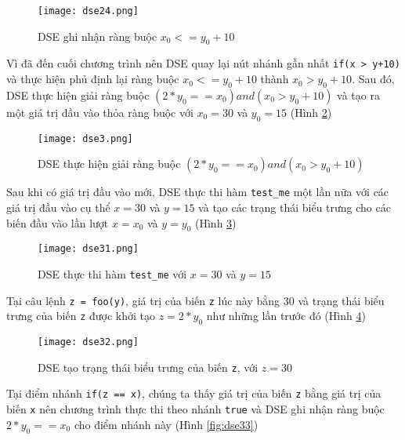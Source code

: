 \begin{figure}[H]
	\caption{DSE ghi nhận ràng buộc $x_{0} <= y_{0} + 10$}
	\label{fig:dse24}
	\begin{center}
		\texttt{[image: dse24.png]}
	\end{center}		
\end{figure}

Vì đã đến cuối chương trình nên DSE quay lại nút nhánh gần nhất \texttt{if(x > y+10)} và thực hiện phủ định lại ràng buộc $x_{0} <= y_{0} + 10$ thành $ x_{0} > y_{0} + 10 $. Sau đó, DSE thực hiện giải ràng buộc $(2*y_{0} == x_{0}) and (x_{0} > y_{0} + 10)$ và tạo ra một giá trị đầu vào thỏa ràng buộc với $x_{0} = 30$ và $y_{0} = 15$ (Hình \ref{fig:dse3})

\begin{figure}[H]
	\caption{DSE thực hiện giải ràng buộc $(2*y_{0} == x_{0}) and (x_{0} > y_{0} + 10)$}
	\label{fig:dse3}
	\begin{center}
		\texttt{[image: dse3.png]}
	\end{center}
\end{figure}

Sau khi có giá trị đầu vào mới, DSE thực thi hàm \texttt{test\_me} một lần nữa với các giá trị đầu vào cụ thể $x = 30$ và $y = 15$ và tạo các trạng thái biểu trưng cho các biến đầu vào lần lượt $x = x_{0}$ và $y = y_{0}$ (Hình \ref{fig:dse31})

\begin{figure}[H]
	\caption{DSE thực thi hàm \texttt{test\_me} với $ x = 30 $ và $ y = 15 $}
	\label{fig:dse31}
	\begin{center}
		\texttt{[image: dse31.png]}
	\end{center}
\end{figure}


Tại câu lệnh \texttt{z = foo(y)}, giá trị của biến \texttt{z} lúc này bằng $ 30 $ và trạng thái biểu trưng của biến \texttt{z} được khởi tạo $ z = 2*y_{0} $ như những lần trước đó (Hình \ref{fig:dse32})

\begin{figure}[H]
	\caption{DSE tạo trạng thái biểu trưng của biến \texttt{z}, với $ z = 30 $}
	\label{fig:dse32}
	\begin{center}
		\texttt{[image: dse32.png]}
	\end{center}
\end{figure}


Tại điểm nhánh \texttt{if(z == x)}, chúng ta thấy giá trị của biến \texttt{z} bằng giá trị của biến \texttt{x} nên chương trình thực thi theo nhánh \texttt{true} và DSE ghi nhận ràng buộc $ 2*y_{0} == x_{0} $ cho điểm nhánh này (Hình \ref{fig:dse33})

